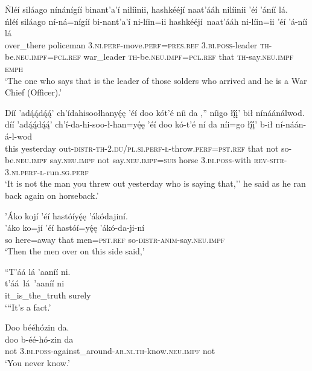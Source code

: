 \ea\label{ex:text1-56-2}
Ńléí siláago nínánígíí binant’a’í nilíinii, hashkééjí naat’ááh nilíinii ’éí ’áníí lá.\\
\gll ńléí	siláago	ní-ná=nígíí	bi-nant’a’í	ni-líin=ii	hashkééjí~{naat’ááh}	ni-líin=ii	’éí	’á-níí	lá\\
     over\_there	policeman	3.\textsc{ni}.\textsc{perf}-move.\textsc{perf}=\textsc{pres}.\textsc{ref}	3.\textsc{bi}.\textsc{poss}-leader	\textsc{th}-be.\textsc{neu}.\textsc{impf}=\textsc{pcl}.\textsc{ref}	war\_leader	\textsc{th}-be.\textsc{neu}.\textsc{impf}=\textsc{pcl}.\textsc{ref}	that	\textsc{th}-say.\textsc{neu}.\textsc{impf}	\textsc{emph}\\
\glt `The one who says that is the leader of those solders who arrived and he is a War Chief (Officer).'
\z

\ea\label{ex:text1-56-3}
Díí ’adą́ą́dą́ą́’ ch’ídahisoołhanyę́ę ’éí doo kót’é níi da ,'' níigo łį́į́’ bił nínáánálwod.\\
\gll díí	’adą́ą́dą́ą́’	ch’í-da-hi-soo-ł-han=yę́ę	’éí	doo	kó-t’é	ní	da	níi=go	łį́į́’	b-ił	ní-náán-á-l-wod\\
     this	yesterday	out-\textsc{distr}-\textsc{th}-2.\textsc{du}/\textsc{pl}.\textsc{si}.\textsc{perf}-\textsc{ł}-throw.\textsc{perf}=\textsc{pst}.\textsc{ref}	that	not	so-be.\textsc{neu}.\textsc{impf}	say.\textsc{neu}.\textsc{impf}	not	say.\textsc{neu}.\textsc{impf}=\textsc{sub}	horse	3.\textsc{bi}.\textsc{poss}-with	\textsc{rev}-\textsc{sitr}-3.\textsc{ni}.\textsc{perf}-\textsc{l}-run.\textsc{sg}.\textsc{perf}\\
\glt `It is not the man you threw out yesterday who is saying that,'' he said as he ran back again on horseback.'
\z

\ea\label{ex:text1-57-1}
’Áko kojí ’éí hastóíyę́ę ’ákódajiní.\\
\gll ’áko	ko=jí	’éí	hastóí=yę́ę	’ákó-da-ji-ní\\
     so	here=away	that	men=\textsc{pst}.\textsc{ref}	so-\textsc{distr}-\textsc{anim}-say.\textsc{neu}.\textsc{impf}\\
\glt `Then the men over on this side said,'
\z

\ea\label{ex:text1-57-2}
``T’áá lá ’aaníí ni.\\
\gll t’áá~lá~{’aaníí}	ni\\
     it\_is\_the\_truth	surely\\
\glt `{``}It's a fact.'
\z

\ea\label{ex:text1-57-3}
Doo bééhózin da.\\
\gll doo	b-éé-hó-zin	da\\
     not	3.\textsc{bi}.\textsc{poss}-against\_around-\textsc{ar}.\textsc{ni}.\textsc{th}-know.\textsc{neu}.\textsc{impf}	not\\
\glt `You never know.'
\z


